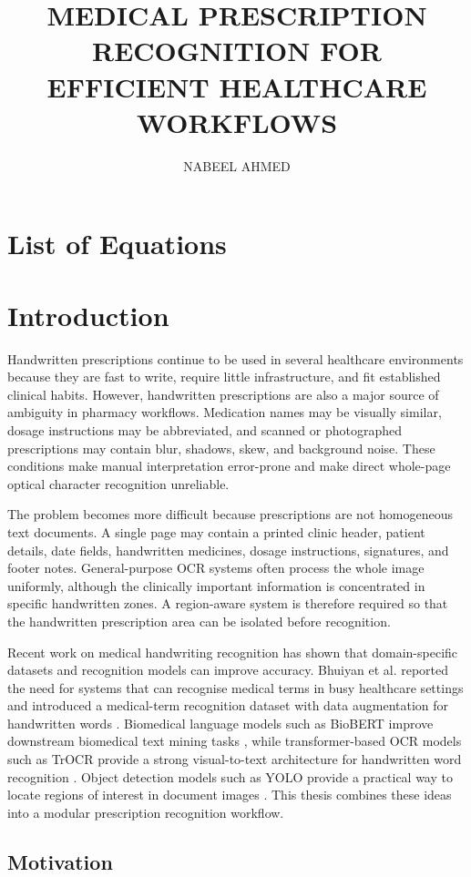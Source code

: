 \documentclass[modernstyle,12pt]{thesis}
\title{\uppercase{Medical Prescription Recognition for Efficient Healthcare Workflows}}
\author{\uppercase{Nabeel Ahmed}}{\uppercase{}}
\makeatletter
\newcommand{\listofequations}{%
  \clearpage
  \chapter*{List of Equations}%
  \addcontentsline{toc}{chapter}{List of Equations}%
  \@starttoc{loe}%
}
\makeatother
\begin{document}
\listofequations
\clearpage
{}

\chapter{Introduction}
\label{chap:introduction}

Handwritten prescriptions continue to be used in several healthcare environments because they are fast to write, require little infrastructure, and fit established clinical habits. However, handwritten prescriptions are also a major source of ambiguity in pharmacy workflows. Medication names may be visually similar, dosage instructions may be abbreviated, and scanned or photographed prescriptions may contain blur, shadows, skew, and background noise. These conditions make manual interpretation error-prone and make direct whole-page optical character recognition unreliable.

The problem becomes more difficult because prescriptions are not homogeneous text documents. A single page may contain a printed clinic header, patient details, date fields, handwritten medicines, dosage instructions, signatures, and footer notes. General-purpose OCR systems often process the whole image uniformly, although the clinically important information is concentrated in specific handwritten zones. A region-aware system is therefore required so that the handwritten prescription area can be isolated before recognition.

Recent work on medical handwriting recognition has shown that domain-specific datasets and recognition models can improve accuracy. Bhuiyan et al. reported the need for systems that can recognise medical terms in busy healthcare settings and introduced a medical-term recognition dataset with data augmentation for handwritten words \cite{bhuiyan2022online}. Biomedical language models such as BioBERT improve downstream biomedical text mining tasks \cite{lee2020biobert}, while transformer-based OCR models such as TrOCR provide a strong visual-to-text architecture for handwritten word recognition \cite{li2023trocr}. Object detection models such as YOLO provide a practical way to locate regions of interest in document images \cite{jocher2023yolo}. This thesis combines these ideas into a modular prescription recognition workflow.

\section{Motivation}
\end{document}
